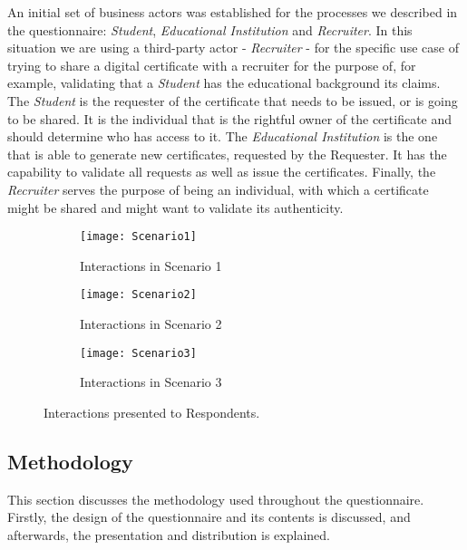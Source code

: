 An initial set of business actors was established for the processes we described in the questionnaire: \textit{Student}, \textit{Educational Institution} and \textit{Recruiter}. In this situation we are using a third-party actor - \textit{Recruiter} - for the specific use case of trying to share a digital certificate with a recruiter for the purpose of, for example, validating that a \textit{Student} has the educational background its claims. The \textit{Student} is the requester of the certificate that needs to be issued, or is going to be shared. It is the individual that is the rightful owner of the certificate and should determine who has access to it. The \textit{Educational Institution} is the one that is able to generate new certificates, requested by the Requester. It has the capability to validate all requests as well as issue the certificates. Finally, the \textit{Recruiter} serves the purpose of being an individual, with which a certificate might be shared and might want to validate its authenticity. 

\begin{figure}[htb]
    \centering
    \begin{subfigure}[b]{0.3\textwidth}
        \centering
        \texttt{[image: Scenario1]}
        \caption{Interactions in Scenario 1}
        \label{fig: Scenario1}
    \end{subfigure}
    \begin{subfigure}[b]{0.3\textwidth}
        \centering
        \texttt{[image: Scenario2]}
        \caption{Interactions in Scenario 2} 
        \label{fig: Scenario2}
    \end{subfigure}
    \begin{subfigure}[b]{0.3\textwidth}
        \centering
        \texttt{[image: Scenario3]}
        \caption{Interactions in Scenario 3} 
        \label{fig: Scenario3}
    \end{subfigure}
    
    \caption{Interactions presented to Respondents.}
\end{figure}

\subsection{Methodology}
  
This section discusses the methodology used throughout the questionnaire. Firstly, the design of the questionnaire and its contents is discussed, and afterwards, the presentation and distribution is explained.

